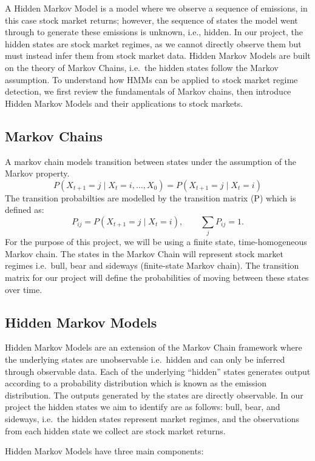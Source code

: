 \documentclass[
]{article}
\begin{document}
A Hidden Markov Model is a model where we observe a sequence of
emissions, in this case stock market returns; however, the sequence of
states the model went through to generate these emissions is unknown,
i.e., hidden. In our project, the hidden states are stock market
regimes, as we cannot directly observe them but must instead infer them
from stock market data. Hidden Markov Models are built on the theory of
Markov Chains, i.e.~the hidden states follow the Markov assumption. To
understand how HMMs can be applied to stock market regime detection, we
first review the fundamentals of Markov chains, then introduce Hidden
Markov Models and their applications to stock markets.

\subsection{Markov Chains}\label{markov-chains}

A markov chain models transition between states under the assumption of
the Markov property. \[
P(X_{t+1}=j\mid X_t=i,\ldots,X_0)
=
P(X_{t+1}=j\mid X_t=i)
\] The transition probabilties are modelled by the transition matrix (P)
which is defined as: \[
P_{ij}=P(X_{t+1}=j\mid X_t=i),
\qquad
\sum_j P_{ij}=1.
\] For the purpose of this project, we will be using a finite state,
time-homogeneous Markov chain. The states in the Markov Chain will
represent stock market regimes i.e.~bull, bear and sideways
(finite-state Markov chain). The transition matrix for our project will
define the probabilities of moving between these states over time.

\subsection{Hidden Markov Models}\label{hidden-markov-models}

Hidden Markov Models are an extension of the Markov Chain framework
where the underlying states are unobservable i.e.~hidden and can only be
inferred through observable data. Each of the underlying ``hidden''
states generates output according to a probability distribution which is
known as the emission distribution. The outputs generated by the states
are directly observable. In our project the hidden states we aim to
identify are as follows: bull, bear, and sideways, i.e.~the hidden
states represent market regimes, and the observations from each hidden
state we collect are stock market returns.

Hidden Markov Models have three main components:
\end{document}
